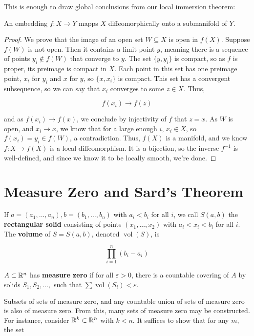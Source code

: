 This is enough to draw global conclusions from our local immersion theorem:

\begin{theorem}
    An embedding $f: X \to Y$ mapps $X$ diffeomorphically onto a submanifold of $Y$. 
\end{theorem}

\begin{proof}
    We prove that the image of an open set $W \subseteq X$ is open in $f(X)$. Suppose $f(W)$ is not open. Then it contains a limit point $y$, meaning there is a sequence of points $y_i \notin f(W)$ that converge to $y$. The set $\{y, y_i\}$ is compact, so as $f$ is proper, its preimage is compact in $X$. Each point in this set has one preimage point, $x_i$ for $y_i$ and $x$ for $y$, so $\{x,x_i\}$ is compact. This set has a convergent subsequence, so we can say that $x_i$ converges to some $z \in X$. Thus,

    \[f(x_i) \to f(z)\]

    and as $f(x_i) \to f(x)$, we conclude by injectivity of $f$ that $z = x$. As $W$ is open, and $x_i \to x$, we know that for a large enough $i$, $x_i \in X$, so $f(x_i) = y_i \in f(W)$, a contradiction. Thus, $f(X)$ is a manifold, and we know $f: X \to f(X)$ is a local diffeomorphism. It is a bijection, so the inverse $f^{-1}$ is well-defined, and since we know it to be locally smooth, we're done. 
\end{proof}

\section{Measure Zero and Sard's Theorem}

If $a = (a_1,\ldots,a_n), b = (b_1,\ldots,b_n)$ with $a_i < b_i$ for all $i$, we call $S(a,b)$ the \textbf{rectangular solid} consisting of points $(x_1,\ldots,x_2)$ with $a_i < x_i < b_i$ for all $i$. The \textbf{volume} of $S = S(a,b)$, denoted $\operatorname{vol}(S)$, is 

\[\prod_{i=1}^n (b_i-a_i)\]

\begin{definition}
    $A \subset \mathbb{R}^n$ has \textbf{measure zero} if for all $\varepsilon > 0$, there is a countable covering of $A$ by solids $S_1,S_2,\ldots,$ such that $\sum \operatorname{vol}(S_i) < \varepsilon$. 
\end{definition}

Subsets of sets of measure zero, and any countable union of sets of measure zero is also of measure zero. From this, many sets of measure zero may be constructed. For instance, consider $\mathbb{R}^k \subset \mathbb{R}^n$ with $k < n$. It suffices to show that for any $m$, the set 

